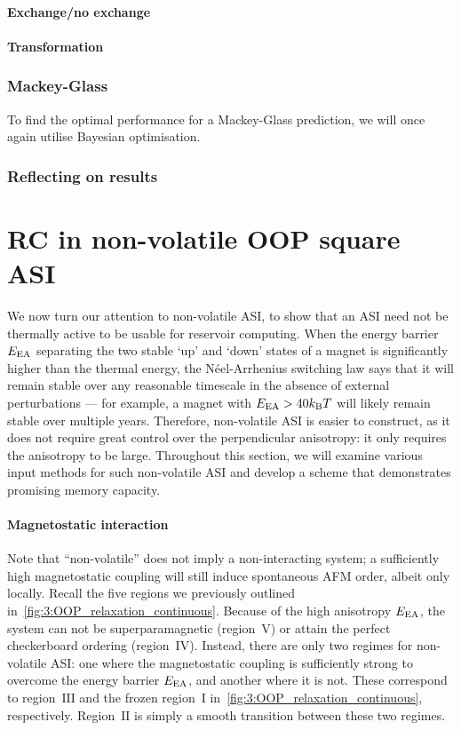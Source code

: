 \paragraph{Exchange/no exchange}
\paragraph{Transformation}
\subsubsection{Mackey-Glass}
To find the optimal performance for a Mackey-Glass prediction, we will once again utilise Bayesian optimisation.
\subsubsection{Reflecting on results} %

\newpage
\section{RC in non-volatile OOP square ASI}
We now turn our attention to non-volatile ASI, to show that an ASI need not be thermally active to be usable for reservoir computing.
When the energy barrier $E_\mathrm{EA}$ separating the two stable `up' and `down' states of a magnet is significantly higher than the thermal energy, the N\'eel-Arrhenius switching law says that it will remain stable over any reasonable timescale in the absence of external perturbations --- for example, a magnet with $\EEA > 40 \kBT$ will likely remain stable over multiple years.
Therefore, non-volatile ASI is easier to construct, as it does not require great control over the perpendicular anisotropy: it only requires the anisotropy to be large.
Throughout this section, we will examine various input methods for such non-volatile ASI and develop a scheme that demonstrates promising memory capacity.

\paragraph{Magnetostatic interaction}
Note that ``non-volatile'' does not imply a non-interacting system; a sufficiently high magnetostatic coupling will still induce spontaneous AFM order, albeit only locally.
Recall the five regions we previously outlined in~\cref{fig:3:OOP_relaxation_continuous}.
Because of the high anisotropy $E_\mathrm{EA}$, the system can not be superparamagnetic (region~$\mathrm{V}$) or attain the perfect checkerboard ordering (region~$\mathrm{IV}$).
Instead, there are only two regimes for non-volatile ASI: one where the magnetostatic coupling is sufficiently strong to overcome the energy barrier $E_\mathrm{EA}$, and another where it is not.
These correspond to region~$\mathrm{III}$ and the frozen region~$\mathrm{I}$ in~\cref{fig:3:OOP_relaxation_continuous}, respectively.
Region~$\mathrm{II}$ is simply a smooth transition between these two regimes. \par


